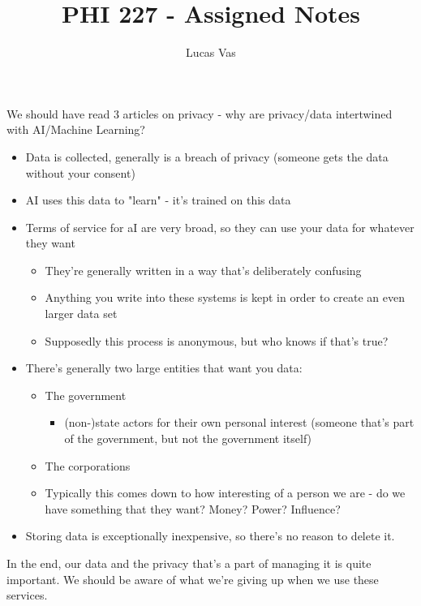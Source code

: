 \documentclass[12pt]{article}
\title{PHI 227 - Assigned Notes}
\author{Lucas Vas}
\begin{document}
    \maketitle

    We should have read 3 articles on privacy - why are privacy/data intertwined with AI/Machine Learning?
    \begin{itemize}
        \item Data is collected, generally is a breach of privacy (someone gets the data without your consent)
        \item AI uses this data to "learn" - it's trained on this data
        \item Terms of service for aI are very broad, so they can use your data for whatever they want
        \begin{itemize}
            \item They're generally written in a way that's deliberately confusing
            \item Anything you write into these systems is kept in order to create an even larger data set
            \item Supposedly this process is anonymous, but who knows if that's true?
        \end{itemize}
        \item There's generally two large entities that want you data:
        \begin{itemize}
            \item The government
            \begin{itemize}
                \item (non-)state actors for their own personal interest (someone that's part of the government, but not the government itself)
            \end{itemize}
            \item The corporations
            \item Typically this comes down to how interesting of a person we are - do we have something that they want? Money? Power? Influence?
        \end{itemize}
        \item Storing data is exceptionally inexpensive, so there's no reason to delete it.
    \end{itemize}

    In the end, our data and the privacy that's a part of managing it is quite important. We should be aware of what we're giving up when we use these services.
\end{document}
